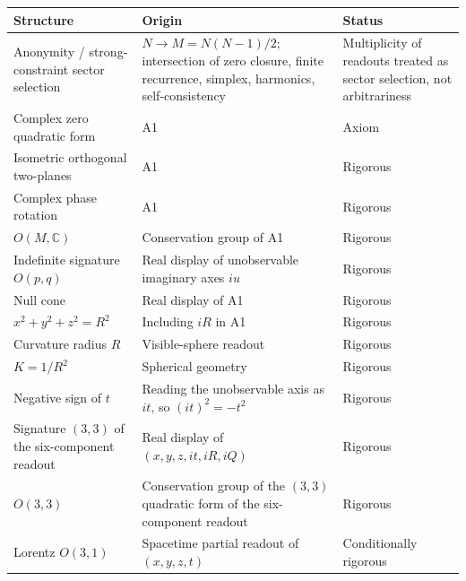\documentclass[
  a4paper,
]{article}
\newcounter{none} %
\begin{document}
{\def\LTcaptype{none} %
\begin{longtable}[]{@{}
  >{\raggedright\arraybackslash}p{}
  >{\raggedright\arraybackslash}p{}
  >{\raggedright\arraybackslash}p{}@{}}
\toprule\noalign{}
\begin{minipage}[b]{\linewidth}\raggedright
Structure
\end{minipage} & \begin{minipage}[b]{\linewidth}\raggedright
Origin
\end{minipage} & \begin{minipage}[b]{\linewidth}\raggedright
Status
\end{minipage} \\
\midrule\noalign{}
\endhead
\bottomrule\noalign{}
\endlastfoot
Anonymity / strong-constraint sector selection & \(N\to M=N(N-1)/2\);
intersection of zero closure, finite recurrence, simplex, harmonics,
self-consistency & Multiplicity of readouts treated as sector selection,
not arbitrariness \\
Complex zero quadratic form & A1 & Axiom \\
Isometric orthogonal two-planes & A1 & Rigorous \\
Complex phase rotation & A1 & Rigorous \\
\(O(M,\mathbb C)\) & Conservation group of A1 & Rigorous \\
Indefinite signature \(O(p,q)\) & Real display of unobservable imaginary
axes \(iu\) & Rigorous \\
Null cone & Real display of A1 & Rigorous \\
\(x^2+y^2+z^2=R^2\) & Including \(iR\) in A1 & Rigorous \\
Curvature radius \(R\) & Visible-sphere readout & Rigorous \\
\(K=1/R^2\) & Spherical geometry & Rigorous \\
Negative sign of \(t\) & Reading the unobservable axis as \(it\), so
\((it)^2=-t^2\) & Rigorous \\
Signature \((3,3)\) of the six-component readout & Real display of
\((x,y,z,it,iR,iQ)\) & Rigorous \\
\(O(3,3)\) & Conservation group of the \((3,3)\) quadratic form of the
six-component readout & Rigorous \\
Lorentz \(O(3,1)\) & Spacetime partial readout of \((x,y,z,t)\) &
Conditionally rigorous \\

\end{longtable}}
\end{document}
